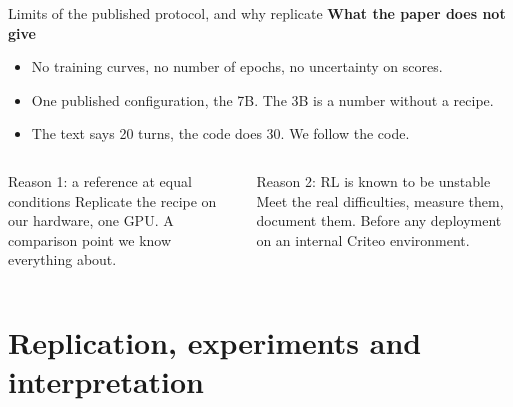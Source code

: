 \documentclass[aspectratio=169,10pt]{beamer}
\begin{document}
\begin{frame}{Limits of the published protocol, and why replicate}
\textbf{What the paper does not give}
\begin{itemize}
  \item No training curves, no number of epochs, no uncertainty on scores.
  \item One published configuration, the 7B. The 3B is a number without a recipe.
  \item The text says 20 turns, the code does 30. We follow the code.
\end{itemize}
\vspace{0.3cm}
\begin{columns}[T]
\begin{block}{Reason 1: a reference at equal conditions}
Replicate the recipe on our hardware, one GPU. A comparison point we know everything about.
\end{block}
\begin{block}{Reason 2: RL is known to be unstable}
Meet the real difficulties, measure them, document them. Before any deployment on an internal Criteo environment.
\end{block}
\end{columns}
\end{frame}

\section{Replication, experiments and interpretation}
\end{document}

